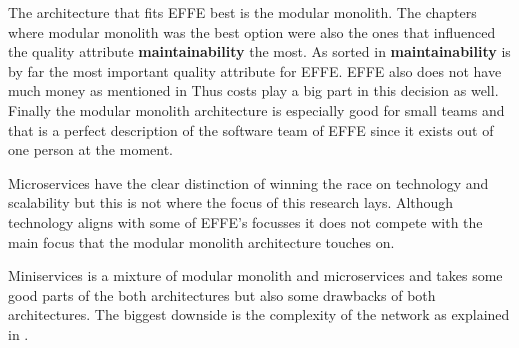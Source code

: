 The architecture that fits EFFE best is the modular monolith. The chapters where modular monolith was the best option were also the ones that influenced the quality attribute \textbf{maintainability} the most. As sorted in  \textbf{maintainability} is by far the most important quality attribute for EFFE. EFFE also does not have much money as mentioned in  Thus costs play a big part in this decision as well. Finally the modular monolith architecture is especially good for small teams and that is a perfect description of the software team of EFFE since it exists out of one person at the moment.

Microservices have the clear distinction of winning the race on technology and scalability but this is not where the focus of this research lays. Although technology aligns with some of EFFE's focusses it does not compete with the main focus that the modular monolith architecture touches on.

Miniservices is a mixture of modular monolith and microservices and takes some good parts of the both architectures but also some drawbacks of both architectures. The biggest downside is the complexity of the network as explained in .

